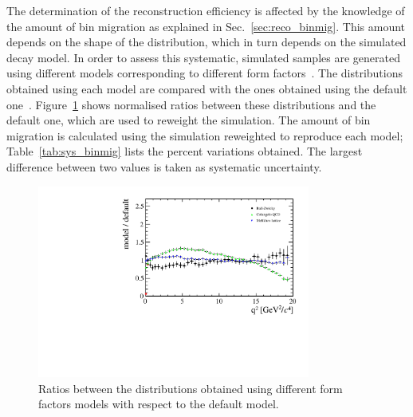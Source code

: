 The determination of the reconstruction efficiency is affected by the knowledge of the
amount of bin migration as explained in Sec.~\ref{sec:reco_binmig}. This amount depends
on the shape of the \qsq distribution, which in turn depends on the simulated \mbox{\BdToKstee} decay model.
In order to assess this systematic, simulated samples are generated using different
models corresponding to different form factors~\cite{Ball:2004ye,Melikhov:2000yu}.
The \qsq distributions obtained using each model are compared with the ones obtained using
the default one~\cite{Ali:1999mm}.
Figure~\ref{fig:q2ratios} shows normalised ratios between these \qsq distributions and the default one, 
which are used to reweight the simulation. The amount of bin migration is calculated
using the simulation reweighted to reproduce each model; Table~\ref{tab:sys_binmig} lists the
percent variations obtained. The largest difference between two values is taken as systematic uncertainty.
%
\begin{figure}[h!]
\centering \includegraphics[width=0.8\textwidth]{RKst/figs/models_ratios.pdf}
\caption{Ratios between the \qsq distributions obtained using different form
factors models with respect to the default model. }
\label{fig:q2ratios}
\end{figure}
%
\begin{table}[h!]
\centering
\caption{Percent variation on the bin migration amount obtained using different form factors models.}
\label{tab:sys_binmig}
\end{table}




